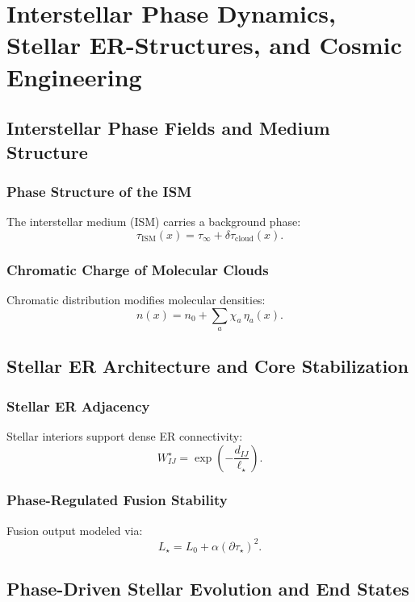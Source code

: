 

\part{Interstellar Phase Dynamics, Stellar ER-Structures, and Cosmic Engineering}

\chapter{Interstellar Phase Fields and Medium Structure}

\section{Phase Structure of the ISM}
The interstellar medium (ISM) carries a background phase:
\[
\tau_{\mathrm{ISM}}(x) = \tau_\infty + \delta\tau_{\mathrm{cloud}}(x).
\]

\section{Chromatic Charge of Molecular Clouds}
Chromatic distribution modifies molecular densities:
\[
n(x) = n_0 + \sum_a \chi_a\,\eta_a(x).
\]

\chapter{Stellar ER Architecture and Core Stabilization}

\section{Stellar ER Adjacency}
Stellar interiors support dense ER connectivity:
\[
W_{IJ}^{\star} = \exp\!\left(-\frac{d_{IJ}}{\ell_\star}\right).
\]

\section{Phase-Regulated Fusion Stability}
Fusion output modeled via:
\[
L_\star = L_0 + \alpha (\partial\tau_\star)^2.
\]

\chapter{Phase-Driven Stellar Evolution and End States}


